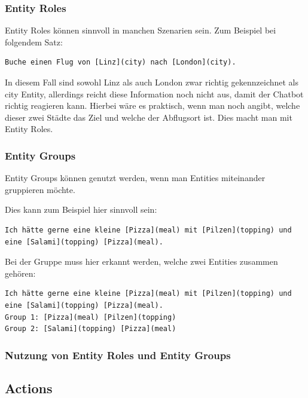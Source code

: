 \subsubsection{Entity Roles}

Entity Roles können sinnvoll in manchen Szenarien sein.
Zum Beispiel bei folgendem Satz:

\begin{lstlisting}[label={lst: Entity Roles Example}]
Buche einen Flug von [Linz](city) nach [London](city).
\end{lstlisting}

In diesem Fall sind sowohl Linz als auch London zwar richtig gekennzeichnet als city Entity, allerdings reicht diese Information noch nicht aus, damit der Chatbot richtig reagieren kann.
Hierbei wäre es praktisch, wenn man noch angibt, welche dieser zwei Städte das Ziel und welche der Abflugsort ist.
Dies macht man mit Entity Roles.\cite{entityRolesGroups}

\subsubsection{Entity Groups}

Entity Groups können genutzt werden, wenn man Entities miteinander gruppieren möchte.\cite{entityRolesGroups}

Dies kann zum Beispiel hier sinnvoll sein:

\begin{lstlisting}[label={lst: Entity Groups Example 1}]
Ich hätte gerne eine kleine [Pizza](meal) mit [Pilzen](topping) und eine [Salami](topping) [Pizza](meal).
\end{lstlisting}

Bei der Gruppe muss hier erkannt werden, welche zwei Entities zusammen gehören\cite{entityRolesGroups}:

\begin{lstlisting}[label={lst: Entity Groups Example 2}]
Ich hätte gerne eine kleine [Pizza](meal) mit [Pilzen](topping) und eine [Salami](topping) [Pizza](meal).
Group 1: [Pizza](meal) [Pilzen](topping)
Group 2: [Salami](topping) [Pizza](meal)
\end{lstlisting}


\subsubsection{Nutzung von Entity Roles und Entity Groups}

\subsection{Actions}

